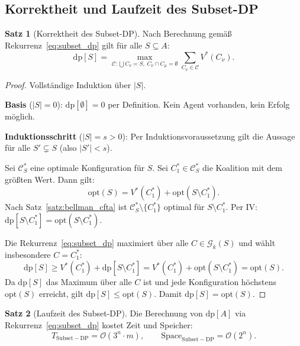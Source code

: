 ﻿\documentclass[a4paper,12pt]{article}
\theoremstyle{definition}
\newtheorem{satz}{Satz}
\begin{document}
\subsection{Korrektheit und Laufzeit des Subset-DP}

\begin{satz}[Korrektheit des Subset-DP]
    \label{satz:subset_correct}
    Nach Berechnung gem\"{a}{\ss} Rekurrenz~\eqref{eq:subset_dp} gilt f\"{u}r alle
    $S \subseteq A$:
    \[
        \mathrm{dp}[S] = \max_{\mathcal{C}: \bigcup C_\nu = S,\; C_\nu \cap C_\mu = \emptyset}
        \sum_{C_\nu \in \mathcal{C}} V^*(C_\nu).
    \]
\end{satz}

\begin{proof}
    Vollst\"{a}ndige Induktion \"{u}ber $|S|$.

    \textbf{Basis} ($|S| = 0$): $\mathrm{dp}[\emptyset] = 0$ per Definition.
    Kein Agent vorhanden, kein Erfolg m\"{o}glich. \checkmark

    \textbf{Induktionsschritt} ($|S| = s > 0$):
    Per Induktionsvoraussetzung gilt die Aussage f\"{u}r alle
    $S' \subsetneq S$ (also $|S'| < s$).

    Sei $\mathcal{C}^*_S$ eine optimale Konfiguration f\"{u}r $S$.
    Sei $C_1^* \in \mathcal{C}^*_S$ die Koalition mit dem gr\"{o}{\ss}ten Wert.
    Dann gilt:
    \[
        \mathrm{opt}(S) = V^*(C_1^*) + \mathrm{opt}(S \setminus C_1^*).
    \]
    Nach Satz~\ref{satz:bellman_cfta} ist $\mathcal{C}^*_S \setminus \{C_1^*\}$
    optimal f\"{u}r $S \setminus C_1^*$. Per IV:
    $\mathrm{dp}[S \setminus C_1^*] = \mathrm{opt}(S \setminus C_1^*)$.

    Die Rekurrenz~\eqref{eq:subset_dp} maximiert \"{u}ber alle
    $C \in \mathcal{G}_k(S)$ und w\"{a}hlt insbesondere $C = C_1^*$:
    \[
        \mathrm{dp}[S] \geq V^*(C_1^*) + \mathrm{dp}[S \setminus C_1^*]
        = V^*(C_1^*) + \mathrm{opt}(S \setminus C_1^*) = \mathrm{opt}(S).
    \]
    Da $\mathrm{dp}[S]$ das Maximum \"{u}ber alle $C$ ist und jede Konfiguration
    h\"{o}chstens $\mathrm{opt}(S)$ erreicht, gilt $\mathrm{dp}[S] \leq \mathrm{opt}(S)$.
    Damit $\mathrm{dp}[S] = \mathrm{opt}(S)$. \qedhere
\end{proof}

\begin{satz}[Laufzeit des Subset-DP]
    \label{satz:subset_runtime}
    Die Berechnung von $\mathrm{dp}[A]$ via Rekurrenz~\eqref{eq:subset_dp}
    kostet Zeit und Speicher:
    \[
        T_{\mathrm{Subset-DP}} = \mathcal{O}(3^n \cdot m),
        \qquad
        \mathrm{Space}_{\mathrm{Subset-DP}} = \mathcal{O}(2^n).
    \]
\end{satz}
\end{document}
